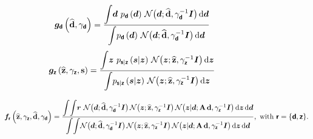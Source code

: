 \documentclass[pmlr,twocolumn,10pt]{jmlr} %
\begin{document}
\begin{figure*}[ht!]
\scriptsize
\begin{multicols}{2}
  \begin{equation}
    \label{eq:denoising-function-d}
      \bm{g}_{\bm{\mathsf{d}}}\left(\mathbf{\widehat{d}}, \gamma_{\bm{\mathsf{d}}}\right) = \frac{ \mathlarger{\int} \boldsymbol{d}\,\,p_{\bm{\mathsf{d}}}\left(\boldsymbol{d}\right)\,\mathcal{N}\big(\boldsymbol{d}; \mathbf{\widehat{d}}, \gamma_{\bm{\mathsf{d}}}^{-1}\bm{I}\big) \,\textrm{d}\boldsymbol{d}}{\mathlarger{\int} p_{\bm{\mathsf{d}}}\left(\boldsymbol{d}\right)\,\mathcal{N}\big(\boldsymbol{d}; \mathbf{\widehat{d}}, \gamma_{\bm{\mathsf{d}}}^{-1}\bm{I}\big)\, \textrm{d}\boldsymbol{d}}
  \end{equation}\break
  \begin{equation}
    \label{eq:denoising-function-z-non-linear}
    \bm{g}_{\bm{\mathsf{z}}}\left(\mathbf{\widehat{z}}, \gamma_{\bm{\mathsf{z}}},\mathbf{s}\right) = \frac{ \mathlarger{\int} \boldsymbol{z}\,\,p_{\bm{\mathsf{s}}|\bm{\mathsf{z}}}\left(\boldsymbol{s}|\boldsymbol{z}\right)\,\mathcal{N}\big(\boldsymbol{z}; \mathbf{\widehat{z}}, \gamma_{\bm{\mathsf{z}}}^{-1}\bm{I}\big) \,\textrm{d}\boldsymbol{z}}{\mathlarger{\int} p_{\bm{\mathsf{s}}|\bm{\mathsf{z}}}\left(\boldsymbol{s}|\boldsymbol{z}\right)\,\mathcal{N}\big(\boldsymbol{z}; \mathbf{\widehat{z}}, \gamma_{\bm{\mathsf{z}}}^{-1}\bm{I}\big)\, \textrm{d}\boldsymbol{z}}
  \end{equation}
\end{multicols}
\vspace{-0.5cm}
\begin{equation}
\label{eq:denoising-function-z}
\hspace{0cm}\bm{f}_{\bm{\mathsf{r}}}\left(\mathbf{\widehat{z}}, \gamma_{\bm{\mathsf{z}}}, \mathbf{\widehat{d}}, \gamma_{\bm{\mathsf{d}}}\right) = \frac{ \mathlarger{\int}\mathlarger{\int} \boldsymbol{r}\,\,\mathcal{N}\big(\boldsymbol{d}; \mathbf{\widehat{d}}, \gamma_{\bm{\mathsf{d}}}^{-1}\bm{I}\big)\,\mathcal{N}\big(\boldsymbol{z}; \mathbf{\widehat{z}}, \gamma_{\bm{\mathsf{z}}}^{-1}\bm{I}\big)\,\mathcal{N}\big(\boldsymbol{z}|\boldsymbol{d}; \mathbf{\bm{A}\,\boldsymbol{d}}, \gamma_{\bm{\mathsf{z}}}^{-1}\bm{I}\big) \,\textrm{d}\boldsymbol{z}\,\textrm{d}\boldsymbol{d}}{\mathlarger{\int}\mathlarger{\int} \mathcal{N}\big(\boldsymbol{d}; \mathbf{\widehat{d}}, \gamma_{\bm{\mathsf{d}}}^{-1}\bm{I}\big)\,\mathcal{N}\big(\boldsymbol{z}; \mathbf{\widehat{z}}, \gamma_{\bm{\mathsf{z}}}^{-1}\bm{I}\big)\,\mathcal{N}\big(\boldsymbol{z}|\boldsymbol{d}; \mathbf{\bm{A}\,\boldsymbol{d}}, \gamma_{\bm{\mathsf{z}}}^{-1}\bm{I}\big) \,\textrm{d}\boldsymbol{z}\,\textrm{d}\boldsymbol{d}}, ~\text{with}~ \bm{\mathsf{r}} = \{\bm{\mathsf{d}}, \bm{\mathsf{z}}\}.\vspace{-0.7cm}
\end{equation}
\end{figure*}
\end{document}
